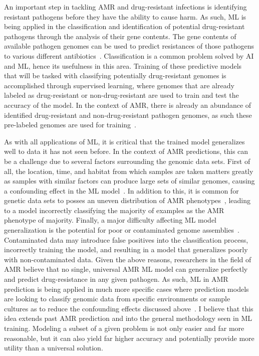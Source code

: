 \documentclass[a4paper]{article}
\begin{document}
An important step in tackling AMR and drug-resistant infections is identifying resistant pathogens before they have the ability to cause harm. As such, ML is being applied in the classification and identification of potential drug-resistant pathogens through the analysis of their gene contents. The gene contents of available pathogen genomes can be used to predict resistances of those pathogens to various different antibiotics~\cite{kim_machine_2022}. Classification is a common problem solved by AI and ML, hence its usefulness in this area. Training of these predictive models that will be tasked with classifying potentially drug-resistant genomes is accomplished through supervised learning, where genomes that are already labeled as drug-resistant or non-drug-resistant are used to train and test the accuracy of the model. In the context of AMR, there is already an abundance of identified drug-resistant and non-drug-resistant pathogen genomes, as such these pre-labeled genomes are used for training~\cite{kim_machine_2022}.

As with all applications of ML, it is critical that the trained model generalizes well to data it has not seen before. In the context of AMR predictions, this can be a challenge due to several factors surrounding the genomic data sets. First of all, the location, time, and habitat from which samples are taken matters greatly as samples with similar factors can produce large sets of similar genomes, causing a confounding effect in the ML model~\cite{kim_machine_2022}. In addition to this, it is common for genetic data sets to posses an uneven distribution of AMR phenotypes~\cite{kim_machine_2022}, leading to a model incorrectly classifying the majority of examples as the AMR phenotype of majority. Finally, a major difficulty affecting ML model generalization is the potential for poor or contaminated genome assemblies~\cite{kim_machine_2022}. Contaminated data may introduce false positives into the classification process, incorrectly training the model, and resulting in a model that generalizes poorly with non-contaminated data. Given the above reasons, researchers in the field of AMR believe that no single, universal AMR ML model can generalize perfectly and predict drug-resistance in any given pathogen. As such, ML in AMR prediction is being applied in much more specific cases where prediction models are looking to classify genomic data from specific environments or sample cultures as to reduce the confounding effects discussed above~\cite{kim_machine_2022}. I believe that this idea extends past AMR prediction and into the general methodology seen in ML training. Modeling a subset of a given problem is not only easier and far more reasonable, but it can also yield far higher accuracy and potentially provide more utility than a universal solution.
\end{document}
